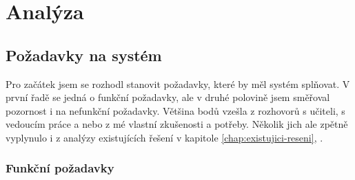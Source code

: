 \documentclass[twoside]{ctuthesis}
\theoremstyle{plain}
\theoremstyle{definition}
\theoremstyle{note}
\begin{document}


\part{Analýza}


%



\chapter{Požadavky na systém}

Pro začátek jsem se rozhodl stanovit požadavky, které by měl systém splňovat.
V první řadě se jedná o funkční požadavky, ale v druhé polovině jsem směřoval pozornost i na nefunkční požadavky. Většina bodů vzešla z rozhovorů s učiteli, s vedoucím práce a nebo z mé vlastní zkušenosti a potřeby. Několik jich ale zpětně vyplynulo i z analýzy existujících řešení v kapitole \ref{chap:existujici-reseni},  .

\section{Funkční požadavky}
\end{document}
